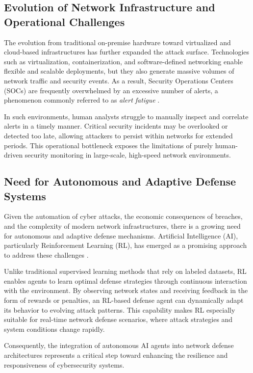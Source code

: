 \documentclass[12pt,a4paper]{report}
\begin{document}
\subsection{Evolution of Network Infrastructure and Operational Challenges}

The evolution from traditional on-premise hardware toward virtualized and cloud-based infrastructures has further expanded the attack surface.
Technologies such as virtualization, containerization, and software-defined networking enable flexible and scalable deployments, but they also generate massive volumes of network traffic and security events.
As a result, Security Operations Centers (SOCs) are frequently overwhelmed by an excessive number of alerts, a phenomenon commonly referred to as \emph{alert fatigue} \cite{alertFatigue2022}.

In such environments, human analysts struggle to manually inspect and correlate alerts in a timely manner.
Critical security incidents may be overlooked or detected too late, allowing attackers to persist within networks for extended periods.
This operational bottleneck exposes the limitations of purely human-driven security monitoring in large-scale, high-speed network environments.

\subsection{Need for Autonomous and Adaptive Defense Systems}

Given the automation of cyber attacks, the economic consequences of breaches, and the complexity of modern network infrastructures, there is a growing need for autonomous and adaptive defense mechanisms.
Artificial Intelligence (AI), particularly Reinforcement Learning (RL), has emerged as a promising approach to address these challenges \cite{nguyen2021deep}.

Unlike traditional supervised learning methods that rely on labeled datasets, RL enables agents to learn optimal defense strategies through continuous interaction with the environment.
By observing network states and receiving feedback in the form of rewards or penalties, an RL-based defense agent can dynamically adapt its behavior to evolving attack patterns.
This capability makes RL especially suitable for real-time network defense scenarios, where attack strategies and system conditions change rapidly.

Consequently, the integration of autonomous AI agents into network defense architectures represents a critical step toward enhancing the resilience and responsiveness of cybersecurity systems.
\end{document}

